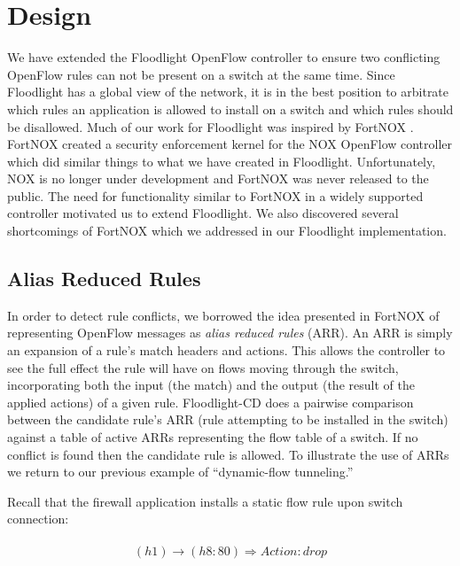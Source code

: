 \section{Design}
\label{sec:design}

We have extended the Floodlight OpenFlow controller to ensure two conflicting OpenFlow rules can not be present on a switch at the same time.
Since Floodlight has a global view of the network, it is in the best position to arbitrate which rules an application is allowed to install on a switch and which rules should be disallowed.
Much of our work for Floodlight was inspired by FortNOX \cite{Porras:2012:SEK:2342441.2342466}.
FortNOX created a security enforcement kernel for the NOX OpenFlow controller \cite{Gude:2008:NTO:1384609.1384625} which did similar things to what we have created in Floodlight.
Unfortunately, NOX is no longer under development and FortNOX was never released to the public.
The need for functionality similar to FortNOX in a widely supported controller motivated us to extend Floodlight.
We also discovered several shortcomings of FortNOX which we addressed in our Floodlight implementation.

\subsection{Alias Reduced Rules}
\label{subsec:arr}
In order to detect rule conflicts, we borrowed the idea presented in FortNOX of representing OpenFlow messages as \emph{alias reduced rules} (ARR).
An ARR is simply an expansion of a rule's match headers and actions.
This allows the controller to see the full effect the rule will have on flows moving through the switch, incorporating both the input (the match) and the output (the result of the applied actions) of a given rule.
Floodlight-CD does a pairwise comparison between the candidate rule's ARR (rule attempting to be installed in the switch) against a table of active ARRs representing the flow table of a switch.
If no conflict is found then the candidate rule is allowed.
To illustrate the use of ARRs we return to our previous example of ``dynamic-flow tunneling.'' 

Recall that the firewall application installs a static flow rule upon switch connection:

\begin{align}
\begin{aligned}
\label{eq:staticfirewall}
(h1) \rightarrow (h8:80) \Rightarrow Action: drop 
\end{aligned}
\end{align}

